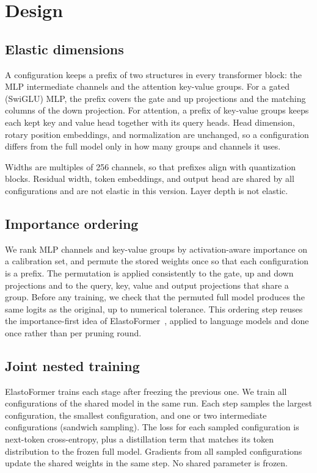 \section{Design}
\label{sec:design}

\subsection{Elastic dimensions}

A configuration keeps a prefix of two structures in every transformer block: the MLP intermediate channels and the attention key-value groups. For a gated (SwiGLU) MLP, the prefix covers the gate and up projections and the matching columns of the down projection. For attention, a prefix of key-value groups keeps each kept key and value head together with its query heads. Head dimension, rotary position embeddings, and normalization are unchanged, so a configuration differs from the full model only in how many groups and channels it uses. 

Widths are multiples of 256 channels, so that prefixes align with quantization blocks. Residual width, token embeddings, and output head are shared by all configurations and are not elastic in this version. Layer depth is not elastic.

\subsection{Importance ordering}

We rank MLP channels and key-value groups by activation-aware importance on a calibration set, and permute the stored weights once so that each configuration is a prefix. The permutation is applied consistently to the gate, up and down projections and to the query, key, value and output projections that share a group. Before any training, we check that the permuted full model produces the same logits as the original, up to numerical tolerance. This ordering step reuses the importance-first idea of ElastoFormer~\cite{kalra2025elastoformer}, applied to language models and done once rather than per pruning round.

\subsection{Joint nested training}

ElastoFormer trains each stage after freezing the previous one. We train all configurations of the shared model in the same run. Each step samples the largest configuration, the smallest configuration, and one or two intermediate configurations (sandwich sampling). The loss for each sampled configuration is next-token cross-entropy, plus a distillation term that matches its token distribution to the frozen full model. Gradients from all sampled configurations update the shared weights in the same step. No shared parameter is frozen. 

